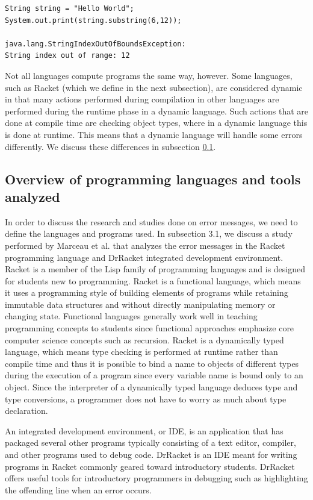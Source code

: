 \documentclass{sig-alternate}
\begin{document}
\begin{verbatim}
String string = "Hello World";
System.out.print(string.substring(6,12));

java.lang.StringIndexOutOfBoundsException:
String index out of range: 12
\end{verbatim}

Not all languages compute programs the same way, however.
Some languages, such as Racket (which we define in the next subsection), are considered dynamic in that many actions performed during compilation in other languages are performed during the runtime phase in a dynamic language.
Such actions that are done at compile time are checking object types, where in a dynamic language this is done at runtime.
This means that a dynamic language will handle some errors differently.
We discuss these differences in subsection \ref{subsec:languages}.


\subsection{Overview of programming languages and tools analyzed}\label{subsec:languages}

In order to discuss the research and studies done on error messages, we need to define the languages and programs used.
In subsection 3.1, we discuss a study performed by Marceau et al. that analyzes the error messages in the Racket programming language and DrRacket integrated development environment.
Racket is a member of the Lisp family of programming languages and is designed for students new to programming.
Racket is a functional language, which means it uses a programming style of building elements of programs while retaining immutable data structures 
and without directly manipulating memory or changing state.
Functional languages generally work well in teaching programming concepts to students since functional approaches emphasize core computer science concepts such as recursion.
Racket is a dynamically typed language, which means type checking is performed at runtime rather than compile time and thus it is possible to bind a name to objects of different types during the execution of a program since every variable name is bound only to an object.
Since the interpreter of a dynamically typed language deduces type and type conversions, a programmer does not have to worry as much about type declaration.

An integrated development environment, or IDE, is an application that has packaged several other programs typically consisting of a text editor, compiler, and other programs used to debug code.
DrRacket is an IDE meant for writing programs in Racket commonly geared toward introductory students.
DrRacket offers useful tools for introductory programmers in debugging such as highlighting the offending line when an error occurs. 
\end{document}
